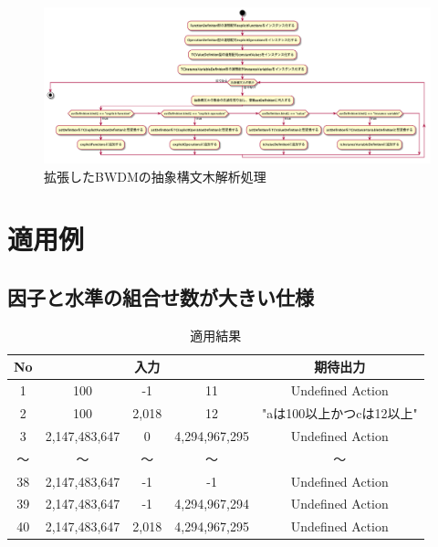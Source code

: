 \documentclass[uplatex, report, a4j, 10pt]{jsbook}
\begin{document}
\begin{figure}[tp]
  \centering
  \includegraphics[keepaspectratio, width=160mm]{figs/ExtendedAstAnalysis}
  \caption{拡張したBWDMの抽象構文木解析処理}
  \label{fig:ExtendedAstAnalysis}
\end{figure}

\chapter{適用例}\label{cha:Indication}
\section{因子と水準の組合せ数が大きい仕様}

\begin{table}[t]
  \begin{center}
    \caption{適用結果}
    \label{tab:pict4javaTekiyourei}
    \begin{tabular}{c|c|c|c|c}
      No & \multicolumn{3}{|c|}{入力} & 期待出力                                             \\
      \hline
      \hline
      1  & 100                        & -1       & 11            & Undefined Action          \\
      2  & 100                        & 2,018    & 12            & "aは100以上かつcは12以上" \\
      3  & 2,147,483,647              & 0        & 4,294,967,295 & Undefined Action          \\
      〜 & 〜                         & 〜       & 〜            & 〜                        \\
      38 & 2,147,483,647              & -1       & -1            & Undefined Action          \\
      39 & 2,147,483,647              & -1       & 4,294,967,294 & Undefined Action          \\
      40 & 2,147,483,647              & 2,018    & 4,294,967,295 & Undefined Action          \\
      \hline
    \end{tabular}
  \end{center}
\end{table}
\end{document}
